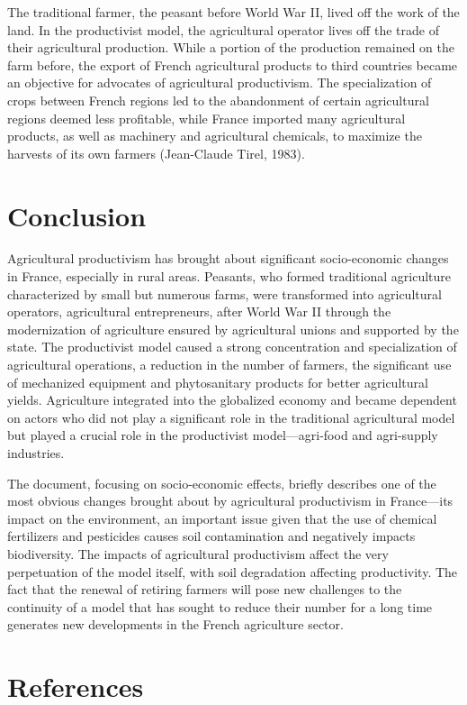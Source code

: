 \documentclass[12pt]{article}
\begin{document}
The traditional farmer, the peasant before World War II, lived off the work of the land. In the productivist model, the agricultural operator lives off the trade of their agricultural production. While a portion of the production remained on the farm before, the export of French agricultural products to third countries became an objective for advocates of agricultural productivism. The specialization of crops between French regions led to the abandonment of certain agricultural regions deemed less profitable, while France imported many agricultural products, as well as machinery and agricultural chemicals, to maximize the harvests of its own farmers (Jean-Claude Tirel, 1983).

\newpage
\section*{Conclusion}

Agricultural productivism has brought about significant socio-economic changes in France, especially in rural areas. Peasants, who formed traditional agriculture characterized by small but numerous farms, were transformed into agricultural operators, agricultural entrepreneurs, after World War II through the modernization of agriculture ensured by agricultural unions and supported by the state. The productivist model caused a strong concentration and specialization of agricultural operations, a reduction in the number of farmers, the significant use of mechanized equipment and phytosanitary products for better agricultural yields. Agriculture integrated into the globalized economy and became dependent on actors who did not play a significant role in the traditional agricultural model but played a crucial role in the productivist model—agri-food and agri-supply industries.

The document, focusing on socio-economic effects, briefly describes one of the most obvious changes brought about by agricultural productivism in France—its impact on the environment, an important issue given that the use of chemical fertilizers and pesticides causes soil contamination and negatively impacts biodiversity. The impacts of agricultural productivism affect the very perpetuation of the model itself, with soil degradation affecting productivity. The fact that the renewal of retiring farmers will pose new challenges to the continuity of a model that has sought to reduce their number for a long time generates new developments in the French agriculture sector.
\newpage
\section*{References}
\end{document}
